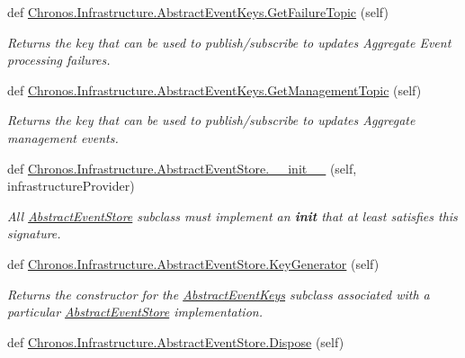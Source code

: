 \begin{DoxyCompactItemize}
def \hyperlink{group__Chronos_gab5dbc212a17aa66d7ec28621aef49f86}{Chronos.\+Infrastructure.\+Abstract\+Event\+Keys.\+Get\+Failure\+Topic} (self)
\begin{DoxyCompactList}\small\item\em Returns the key that can be used to publish/subscribe to updates Aggregate Event processing failures. \end{DoxyCompactList}\item 
def \hyperlink{group__Chronos_gafd61ad1c57013bfbec5d768f57088e18}{Chronos.\+Infrastructure.\+Abstract\+Event\+Keys.\+Get\+Management\+Topic} (self)
\begin{DoxyCompactList}\small\item\em Returns the key that can be used to publish/subscribe to updates Aggregate management events. \end{DoxyCompactList}\item 
def \hyperlink{group__Chronos_ga30a470bc6de0e6aaf468d9ba0abf53be}{Chronos.\+Infrastructure.\+Abstract\+Event\+Store.\+\_\+\+\_\+init\+\_\+\+\_\+} (self, infrastructure\+Provider)
\begin{DoxyCompactList}\small\item\em All \hyperlink{classChronos_1_1Infrastructure_1_1AbstractEventStore}{Abstract\+Event\+Store} subclass must implement an {\bfseries init} that at least satisfies this signature. \end{DoxyCompactList}\item 
def \hyperlink{group__Chronos_ga865256d9e309eb64c77ba073ca53f6d0}{Chronos.\+Infrastructure.\+Abstract\+Event\+Store.\+Key\+Generator} (self)\hypertarget{group__Chronos_ga865256d9e309eb64c77ba073ca53f6d0}{}\label{group__Chronos_ga865256d9e309eb64c77ba073ca53f6d0}

\begin{DoxyCompactList}\small\item\em Returns the constructor for the \hyperlink{classChronos_1_1Infrastructure_1_1AbstractEventKeys}{Abstract\+Event\+Keys} subclass associated with a particular \hyperlink{classChronos_1_1Infrastructure_1_1AbstractEventStore}{Abstract\+Event\+Store} implementation. \end{DoxyCompactList}\item 
def \hyperlink{group__Chronos_ga17c0011d29ca7707d5b790211327b586}{Chronos.\+Infrastructure.\+Abstract\+Event\+Store.\+Dispose} (self)\hypertarget{group__Chronos_ga17c0011d29ca7707d5b790211327b586}{}\label{group__Chronos_ga17c0011d29ca7707d5b790211327b586}


\end{DoxyCompactItemize}
